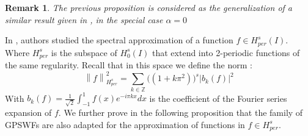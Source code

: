 \documentclass[]{article}
\newtheorem{remark}{Remark}
\newcommand{\Z}{\mathbb Z}
\newcommand{\norm}[1]{{\left\|{#1}\right\|}}
\begin{document}
\begin{remark}
	The previous proposition is considered as the generalization of a similar result given in \cite{Bonami-Karoui4}, in the special case $ \alpha = 0 $
\end{remark}
In \cite{Bonami-Karoui4}, authors studied the spectral approximation of a function $f \in H^s_{per}(I)$. Where $H^s_{per}$ is the subspace of $H^s_{0}(I)$ that extend into 2-periodic functions of the same regularity. Recall that in this space we define the norm :
$$ \norm{f}_{H^s_{per}}^2 = \sum_{k\in \Z} \Big( (1+k\pi^2) \Big)^s |b_k(f)|^2 $$
With $ \displaystyle b_k(f) = \frac{1}{\sqrt{2}} \int_{-1}^{1} f(x) e^{-i\pi k x} dx $ is the coefficient of the Fourier series expansion of $f$. We further prove in the following proposition that the family of GPSWFs are also adapted for the approximation of functions in $f \in H^s_{per}$.
\end{document}
